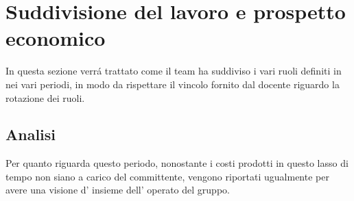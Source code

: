 \section{Suddivisione del lavoro e prospetto economico}
In questa sezione verr\'a trattato come il team \gruppo ha suddiviso i vari ruoli definiti in \NormeDiProgetto~ nei vari periodi, in modo da rispettare il vincolo fornito dal docente riguardo la rotazione dei ruoli.
\subsection{Analisi}
Per quanto riguarda questo periodo, nonostante i costi prodotti in questo lasso di tempo non siano a carico del committente, vengono riportati ugualmente per avere una visione d' insieme dell' operato del gruppo.\\
